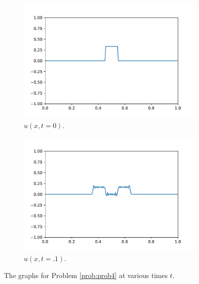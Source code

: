 \begin{problem}
\begin{figure}[H]
\centering
\begin{subfigure}{.49\textwidth}
\centering
\includegraphics[width=\linewidth]{prob4.pdf}
\caption{$u(x,t=0)$.}
\end{subfigure}
%
\begin{subfigure}{.49\textwidth}
\centering
\includegraphics[width=\linewidth]{prob4_t1.pdf}
\caption{$u(x,t = .1)$.}
\end{subfigure}
\caption{The graphs for Problem \ref{prob:prob4} at various times $t$.}
\label{fig:prob4}
\end{figure}
\end{problem}


